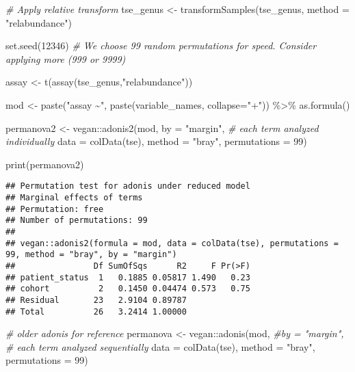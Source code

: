 \documentclass[
  oneside]{book}
\newenvironment{Shaded}{\begin{snugshade}}{\end{snugshade}}
\newcommand{\AttributeTok}[1]{\textcolor[rgb]{0.77,0.63,0.00}{#1}}
\newcommand{\CommentTok}[1]{\textcolor[rgb]{0.56,0.35,0.01}{\textit{#1}}}
\newcommand{\DecValTok}[1]{\textcolor[rgb]{0.00,0.00,0.81}{#1}}
\newcommand{\FunctionTok}[1]{\textcolor[rgb]{0.00,0.00,0.00}{#1}}
\newcommand{\NormalTok}[1]{#1}
\newcommand{\OtherTok}[1]{\textcolor[rgb]{0.56,0.35,0.01}{#1}}
\newcommand{\SpecialCharTok}[1]{\textcolor[rgb]{0.00,0.00,0.00}{#1}}
\newcommand{\StringTok}[1]{\textcolor[rgb]{0.31,0.60,0.02}{#1}}
\begin{document}
\begin{Shaded}
\begin{Highlighting}[]
\CommentTok{\# Apply relative transform}
\NormalTok{tse\_genus }\OtherTok{\textless{}{-}} \FunctionTok{transformSamples}\NormalTok{(tse\_genus, }\AttributeTok{method =} \StringTok{"relabundance"}\NormalTok{)}


\FunctionTok{set.seed}\NormalTok{(}\DecValTok{12346}\NormalTok{)}
\CommentTok{\# We choose 99 random permutations for speed. Consider applying more (999 or 9999) }

\NormalTok{assay }\OtherTok{\textless{}{-}} \FunctionTok{t}\NormalTok{(}\FunctionTok{assay}\NormalTok{(tse\_genus,}\StringTok{"relabundance"}\NormalTok{))}

\NormalTok{mod }\OtherTok{\textless{}{-}} \FunctionTok{paste}\NormalTok{(}\StringTok{"assay \textasciitilde{}"}\NormalTok{, }\FunctionTok{paste}\NormalTok{(variable\_names, }\AttributeTok{collapse=}\StringTok{"+"}\NormalTok{)) }\SpecialCharTok{\%\textgreater{}\%} \FunctionTok{as.formula}\NormalTok{()}

\NormalTok{permanova2 }\OtherTok{\textless{}{-}}\NormalTok{ vegan}\SpecialCharTok{::}\FunctionTok{adonis2}\NormalTok{(mod,}
                     \AttributeTok{by =} \StringTok{"margin"}\NormalTok{, }\CommentTok{\# each term analyzed individually}
                     \AttributeTok{data =} \FunctionTok{colData}\NormalTok{(tse),}
                     \AttributeTok{method =} \StringTok{"bray"}\NormalTok{,}
                     \AttributeTok{permutations =} \DecValTok{99}\NormalTok{)}

\FunctionTok{print}\NormalTok{(permanova2)}
\end{Highlighting}
\end{Shaded}

\begin{verbatim}
## Permutation test for adonis under reduced model
## Marginal effects of terms
## Permutation: free
## Number of permutations: 99
## 
## vegan::adonis2(formula = mod, data = colData(tse), permutations = 99, method = "bray", by = "margin")
##                Df SumOfSqs      R2     F Pr(>F)
## patient_status  1   0.1885 0.05817 1.490   0.23
## cohort          2   0.1450 0.04474 0.573   0.75
## Residual       23   2.9104 0.89787             
## Total          26   3.2414 1.00000
\end{verbatim}

\begin{Shaded}
\begin{Highlighting}[]
\CommentTok{\# older adonis for reference}
\NormalTok{permanova }\OtherTok{\textless{}{-}}\NormalTok{ vegan}\SpecialCharTok{::}\FunctionTok{adonis}\NormalTok{(mod,}
                            \CommentTok{\#by = "margin", \# each term analyzed sequentially}
                            \AttributeTok{data =} \FunctionTok{colData}\NormalTok{(tse),}
                            \AttributeTok{method =} \StringTok{"bray"}\NormalTok{,}
                            \AttributeTok{permutations =} \DecValTok{99}\NormalTok{)}
\end{Highlighting}
\end{Shaded}
\end{document}
